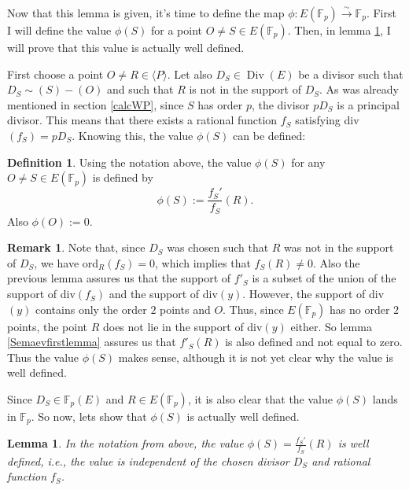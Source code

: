 \documentclass{article}
\numberwithin{equation}{section}
\newtheorem{lemma}[theorem]{Lemma}
\theoremstyle{definition}
\newtheorem{definition}[theorem]{Definition}
\newtheorem{remark}[theorem]{Remark}
\newcommand{\FF}[1]{{\mathbb F}_{#1}} %
\newcommand{\grgen}[1]{\langle #1 \rangle} %
\newcommand{\Div}{\operatorname{Div}} %
\begin{document}
Now that this lemma is given, it's time to define the map $\phi:E(\FF{p}) \overset{\sim}{\rightarrow} \FF{p}$. First I will define the value $\phi(S)$ for a point $O\neq S \in E(\FF{p})$. Then, in lemma \ref{Semaevisoisdefined}, I will prove that this value is actually well defined.\par 
First choose a point $ O\neq R \in \grgen{P}$. Let also $D_S\in\Div(E)$ be a divisor such that $D_S\sim (S)-(O)$ and such that $R$ is not in the support of $D_S$. As was already mentioned in section \ref{calcWP}, since $S$ has order $p$, the divisor $pD_S$ is a principal divisor. This means that there exists a rational function $f_S$ satisfying div$(f_S)=pD_S$. Knowing this, the value $\phi(S)$ can be defined:

\begin{definition}
Using the notation above, the value $\phi(S)$ for any $O \neq S \in E(\FF{p})$ is defined by $$\phi(S):=\frac{f_S'}{f_S}(R).$$ Also $\phi(O):=0$. 
\end{definition} 

\begin{remark}\label{Semaevisoisdefined1}
Note that, since $D_S$ was chosen such that $R$ was not in the support of $D_S$, we have ord$_R(f_S)=0$, which implies that $f_S(R) \neq 0$. Also the previous lemma assures us that the support of $f'_S$ is a subset of the union of the support of div$(f_S)$ and the support of div$(y)$. However, the support of div$(y)$ contains only the order $2$ points and $O$. Thus, since $E(\FF{p})$ has no order $2$ points, the point $R$ does not lie in the support of div$(y)$ either. So lemma \ref{Semaevfirstlemma} assures us that $f'_S(R)$ is also defined and not equal to zero. Thus the value $\phi(S)$ makes sense, although it is not yet clear why the value is well defined.
\end{remark}

Since $D_S\in\FF{p}(E)$ and $R \in E(\FF{p})$, it is also clear that the value $\phi(S)$ lands in $\FF{p}$. So now, lets show that $\phi(S)$ is actually well defined.

\begin{lemma}\label{Semaevisoisdefined}
In the notation from above, the value $\phi(S)=\frac{f_S'}{f_S}(R)$ is well defined, i.e., the value is independent of the chosen divisor $D_S$ and rational function $f_S$.
\end{lemma}
\end{document}
